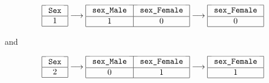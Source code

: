 \documentclass[a4paper,11pt]{article}
\newcommand{\codewhite}[1]{\colorbox{white}{\texttt{#1}}}
\begin{document}

\begin{equation}
\begin{array}{|c|} \hline
\mbox{\codewhite{Sex}} \\ \hline
1 \\ \hline \end{array} 
\longrightarrow
 \begin{array}{|c|c|}  \hline
\mbox{\codewhite{sex\_Male}} & \mbox{\codewhite{sex\_Female}} \\ \hline
1 & 0 \\ \hline
\end{array} 
\longrightarrow
\begin{array}{|c|}  \hline
\mbox{\codewhite{sex\_Female}} \\ \hline
0  \\ \hline \end{array}
\label{eqn:onehotmale}
\end{equation}



and


\begin{equation}
\begin{array}{|c|} \hline
\mbox{\codewhite{Sex}} \\ \hline
2 \\ \hline \end{array} 
\longrightarrow
 \begin{array}{|c|c|}  \hline
\mbox{\codewhite{sex\_Male}} & \mbox{\codewhite{sex\_Female}} \\ \hline
0 & 1 \\ \hline
\end{array} 
\longrightarrow
\begin{array}{|c|}  \hline
\mbox{\codewhite{sex\_Female}} \\ \hline
1  \\ \hline \end{array}
\label{eqn:onehotfemale}
\end{equation}



\end{document}
